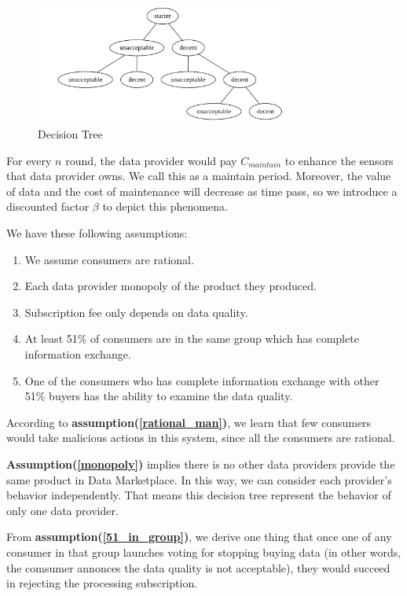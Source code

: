 \documentclass[journal,10pt,a4paper]{IEEEtran}
\begin{document}
\begin{figure} \centering \includegraphics[width=3.3in]{decision_tree} \caption{Decision Tree}
    \label{fig:decision_tree} \end{figure}
For every $n$ round, the data provider would pay $C_{maintain}$ to enhance the sensors that data provider owns. We call this as a maintain period. Moreover, the value of data and the cost of maintenance will decrease as time pass, so we introduce a discounted factor $\beta$ to depict this phenomena.

We have these following assumptions:
\begin{enumerate}
    \item  We assume consumers are rational. \label{rational_man}
    \item  Each data provider monopoly of the product they produced. \label{monopoly}
    \item  Subscription fee only depends on data quality. \label{fee_vs_quality}
    \item  At least 51\% of consumers are in the same group which has complete information exchange.\label{51_in_group} 
    \item  One of the consumers who has complete information exchange with other 51\% buyers has the ability to examine the data quality. \label{1_in_51}
\end{enumerate}

According to \textbf{assumption(\ref{rational_man})}, we learn that few consumers would take malicious actions in this system, since all the consumers are rational.

\textbf{Assumption(\ref{monopoly})} implies there is no other data providers provide the same product in Data Marketplace. In this way, we can consider each provider's behavior independently. That means this decision tree represent the behavior of only one data provider.

From \textbf{assumption(\ref{51_in_group})}, we derive one thing that once one of any consumer in that group launches voting for stopping buying data (in other words, the comsumer annonces the data quality is not acceptable), they would succeed in rejecting the processing subscription.
\end{document}
